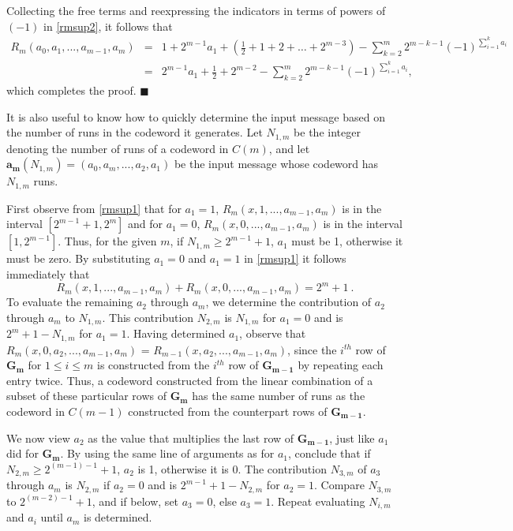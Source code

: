 Collecting the free terms and reexpressing the indicators in terms
of powers of $(-1)$ in \eqref{rmsup2}, it follows that
\begin{equation}\label{rmsup3}\begin{array}{lll}
R_m(a_0,a_1,...,a_{m-1},a_m)&=&1+2^{m-1}a_1+(\frac{1}{2}+1+2+\dots+2^{m-3})-\sum_{k=2}^m
2^{m-k-1}(-1)^{\sum_{i=1}^k a_i}\\
{}&=&2^{m-1}a_1+ \frac{1}{2}+2^{m-2}-\sum_{k=2}^m
2^{m-k-1}(-1)^{\sum_{i=1}^k a_i},
\end{array}\end{equation}
which completes the proof.
 \hfill
$\blacksquare$

It is also useful to know how to quickly determine the input message
based on the number of runs in the codeword it generates. Let
$N_{1,m}$ be the integer denoting the number of runs of a codeword
in $C(m)$, and let $\mathbf{a_m}(N_{1,m})=(a_0,a_m,...,a_{2},a_1)$
be the input message whose codeword has $N_{1,m}$ runs.%

First observe from \eqref{rmsup1} that for $a_1=1$,
$R_m(x,1,...,a_{m-1},a_m)$ is in the interval $[2^{m-1}+1, 2^m]$ and
for $a_1=0$, $R_m(x,0,...,a_{m-1},a_m)$ is in the interval
$[1,2^{m-1}]$. Thus, for the given $m$, if $N_{1,m} \geq 2^{m-1}+1$,
$a_1$ must be 1, otherwise it must be zero. By substituting $a_1=0$
and $a_1=1$ in \eqref{rmsup1} it follows immediately that
\[R_m(x,1,...,a_{m-1},a_m) + R_m(x,0,...,a_{m-1},a_m)=2^m+1~.\]
To evaluate the remaining $a_2$ through $a_m$, we determine the
contribution of $a_2$ through $a_m$ to $N_{1,m}$. This contribution
$N_{2,m}$ is $N_{1,m}$ for $a_1=0$ and is $2^{m}+1-N_{1,m}$ for
$a_1=1$. Having determined $a_1$, observe that
$R_m(x,0,a_2,...,a_{m-1},a_m)$ = $R_{m-1}(x,a_2,...,a_{m-1},a_m)$,
since the $i^{th}$ row of $\mathbf{G_m}$ for $1 \leq i \leq m$ is
constructed from the $i^{th}$ row of $\mathbf{G_{m-1}}$ by repeating
each entry twice. Thus, a codeword constructed from the linear
combination of a subset of these particular rows of $\mathbf{G_m}$
has the same number of runs as the codeword in $C(m-1)$ constructed
from the counterpart rows of $\mathbf{G_{m-1}}$.

We now view $a_2$ as the value that multiplies the last row of
$\mathbf{G_{m-1}}$, just like $a_1$ did for $\mathbf{G_{m}}$. By
using the same line of arguments as for $a_1$, conclude that if
$N_{2,m} \geq 2^{(m-1)-1}+1$, $a_2$ is 1, otherwise it is 0. The
contribution $N_{3,m}$ of $a_3$ through $a_m$ is $N_{2,m}$ if
$a_2=0$ and is $2^{m-1}+1-N_{2,m}$ for $a_2=1$. Compare $N_{3,m}$ to
$2^{(m-2)-1}+1$, and if below, set $a_3=0$, else $a_3=1$. Repeat
evaluating $N_{i,m}$ and $a_i$ until $a_m$ is determined.

